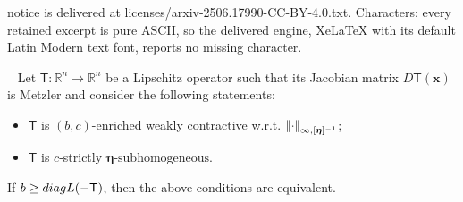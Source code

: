 \documentclass[10pt,a4paper]{amsart}
\newcommand{\Ts}{\mathsf{T}}
\newcommand{\etab}{\boldsymbol{\eta}}
\newcommand{\norm}[1]{{\left\vert\kern-0.25ex\left\vert #1\right\vert\kern-0.25ex\right\vert}}
\newcommand{\rea }{\mathbb{R}}
\newcommand{\xb}{\boldsymbol{x}}
\begin{document}
notice is delivered at licenses/arxiv-2506.17990-CC-BY-4.0.txt. Characters: every retained excerpt is pure ASCII, so the delivered engine, XeLaTeX with its default Latin Modern text font, reports no missing character.
\begin{thm}\label{thm:monoKSPC}
~
Let $\Ts:\rea^n\rightarrow\rea^n$ be a Lipschitz operator such that its Jacobian matrix $D\Ts(\xb)$ is Metzler and consider the following statements:
%
\begin{itemize}
    \item[(i)] $\Ts$ is $(b,c)$-enriched weakly contractive w.r.t. $\norm{\cdot}_{\infty,[\etab]^{-1}}$;
    \item[(ii)] $\Ts$ is $c$-strictly $\etab\text{-subhomogeneous}$.
\end{itemize}
If $b\geq \textnormal{diagL}(-\Ts)$, then the above conditions are equivalent.
\end{thm}
\end{document}

